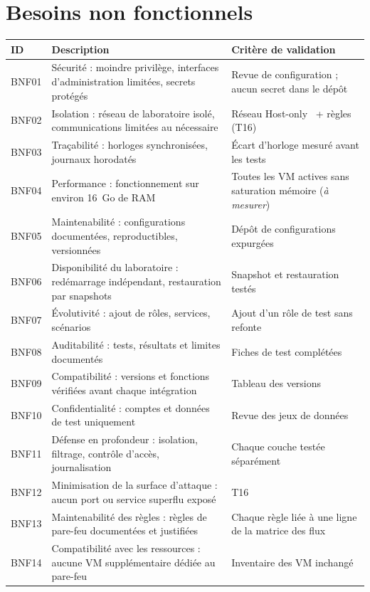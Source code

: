 \documentclass[11pt,a4paper]{report}
\newcommand{\amesurer}{\emph{à mesurer}}
\begin{document}
\section{Besoins non fonctionnels}
\footnotesize
\begin{longtable}{@{}p{1.4cm}p{7.6cm}p{6.2cm}@{}}
\toprule\textbf{ID} & \textbf{Description} & \textbf{Critère de validation}\\ \midrule\endhead
BNF01 & Sécurité : moindre privilège, interfaces d'administration limitées, secrets protégés & Revue de configuration ; aucun secret dans le dépôt\\
BNF02 & Isolation : réseau de laboratoire isolé, communications limitées au nécessaire & Réseau Host-only~\cite{vmware-ho} + règles (T16)\\
BNF03 & Traçabilité : horloges synchronisées, journaux horodatés & Écart d'horloge mesuré avant les tests\\
BNF04 & Performance : fonctionnement sur environ 16~Go de RAM & Toutes les VM actives sans saturation mémoire (\amesurer)\\
BNF05 & Maintenabilité : configurations documentées, reproductibles, versionnées & Dépôt de configurations expurgées\\
BNF06 & Disponibilité du laboratoire : redémarrage indépendant, restauration par snapshots & Snapshot et restauration testés\\
BNF07 & Évolutivité : ajout de rôles, services, scénarios & Ajout d'un rôle de test sans refonte\\
BNF08 & Auditabilité : tests, résultats et limites documentés & Fiches de test complétées\\
BNF09 & Compatibilité : versions et fonctions vérifiées avant chaque intégration & Tableau des versions\\
BNF10 & Confidentialité : comptes et données de test uniquement & Revue des jeux de données\\
BNF11  & Défense en profondeur : isolation, filtrage, contrôle d'accès, journalisation & Chaque couche testée séparément\\
BNF12  & Minimisation de la surface d'attaque : aucun port ou service superflu exposé & T16\\
BNF13  & Maintenabilité des règles : règles de pare-feu documentées et justifiées & Chaque règle liée à une ligne de la matrice des flux\\
BNF14  & Compatibilité avec les ressources : aucune VM supplémentaire dédiée au pare-feu & Inventaire des VM inchangé\\
\bottomrule
\end{longtable}
\normalsize
\end{document}

